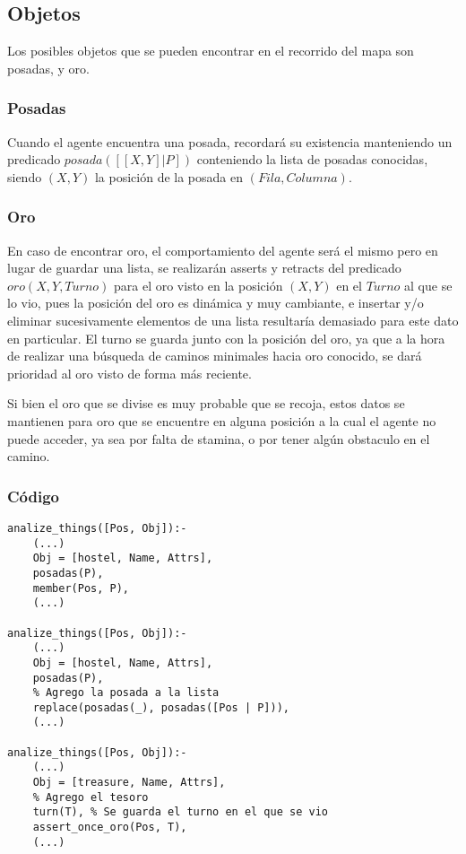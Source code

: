 \documentclass[a4paper,10pt,spanish]{article}
\begin{document}
	\subsection{Objetos}
	
	Los posibles objetos que se pueden encontrar en el recorrido del mapa son posadas, y oro. 
	
		\subsubsection{Posadas}
		
		Cuando el agente encuentra una posada, recordar\'a su existencia manteniendo un predicado $posada([[X, Y] | P])$ conteniendo la lista de posadas conocidas, siendo $(X, Y)$ la posici\'on de la posada en $(Fila,Columna)$.
		
		\subsubsection{Oro}
		
		En caso de encontrar oro, el comportamiento del agente ser\'a el mismo pero en lugar de guardar una lista, se realizar\'an asserts y retracts del predicado $oro(X, Y, Turno)$ para el oro visto en la posici\'on $(X, Y)$ en el $Turno$ al que se lo vio, pues la posici\'on del oro es din\'amica y muy cambiante, e insertar y/o eliminar sucesivamente elementos de una lista resultar\'ia demasiado para este dato en particular. El turno se guarda junto con la posici\'on del oro, ya que a la hora de realizar una b\'usqueda de caminos minimales hacia oro conocido, se dar\'a prioridad al oro visto de forma m\'as reciente.
		
		Si bien el oro que se divise es muy probable que se recoja, estos datos se mantienen para oro que se encuentre en alguna posici\'on a la cual el agente no puede acceder, ya sea por falta de stamina, o por tener alg\'un obstaculo en el camino.
		
		\subsubsection{C\'odigo}
		
		\begin{lstlisting}
analize_things([Pos, Obj]):- 
	(...)
	Obj = [hostel, Name, Attrs],
	posadas(P),
	member(Pos, P),
	(...)

analize_things([Pos, Obj]):- 
	(...)
	Obj = [hostel, Name, Attrs],
	posadas(P),
	% Agrego la posada a la lista
	replace(posadas(_), posadas([Pos | P])),
	(...)

analize_things([Pos, Obj]):- 
	(...)
	Obj = [treasure, Name, Attrs],
	% Agrego el tesoro
	turn(T), % Se guarda el turno en el que se vio
	assert_once_oro(Pos, T),
	(...)
		\end{lstlisting}
	
\end{document}
